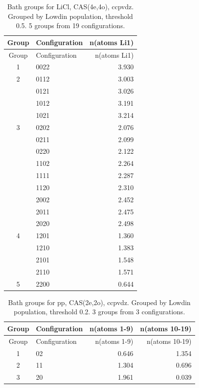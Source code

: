\begin{longtable}{c l r}
\caption{Bath groups for LiCl, CAS(4e,4o), ccpvdz. Grouped by Lowdin population, threshold 0.5. 5 groups from 19 configurations.}\\
\hline
Group & Configuration & n(atoms Li1) \\
\hline
\endfirsthead
\hline
Group & Configuration & n(atoms Li1) \\
\hline
\endhead
1 & 0022 & 3.930 \\
\hline
2 & 0112 & 3.003 \\
 & 0121 & 3.026 \\
 & 1012 & 3.191 \\
 & 1021 & 3.214 \\
\hline
3 & 0202 & 2.076 \\
 & 0211 & 2.099 \\
 & 0220 & 2.122 \\
 & 1102 & 2.264 \\
 & 1111 & 2.287 \\
 & 1120 & 2.310 \\
 & 2002 & 2.452 \\
 & 2011 & 2.475 \\
 & 2020 & 2.498 \\
\hline
4 & 1201 & 1.360 \\
 & 1210 & 1.383 \\
 & 2101 & 1.548 \\
 & 2110 & 1.571 \\
\hline
5 & 2200 & 0.644 \\
\hline
\end{longtable}

\begin{longtable}{c l rr}
\caption{Bath groups for pp, CAS(2e,2o), ccpvdz. Grouped by Lowdin population, threshold 0.2. 3 groups from 3 configurations.}\\
\hline
Group & Configuration & n(atoms 1-9) & n(atoms 10-19) \\
\hline
\endfirsthead
\hline
Group & Configuration & n(atoms 1-9) & n(atoms 10-19) \\
\hline
\endhead
1 & 02 & 0.646 & 1.354 \\
\hline
2 & 11 & 1.304 & 0.696 \\
\hline
3 & 20 & 1.961 & 0.039 \\
\hline
\end{longtable}


